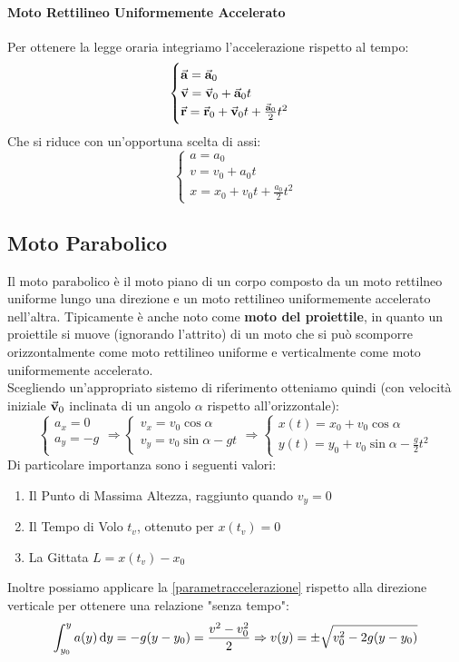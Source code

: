 \documentclass{report}
\newcommand{\then}{\ensuremath{\Rightarrow}}
\renewcommand{\a}{\va{a}}
\renewcommand{\v}{\va{v}}
\renewcommand{\r}{\va{r}}
\begin{document}
\paragraph{Moto Rettilineo Uniformemente Accelerato}
Per ottenere la legge oraria integriamo l'accelerazione rispetto al tempo:
\begin{equation}
\begin{cases}
\a=\a_0\\
\v=\v_0+\a_0t\\
\r=\r_0+\v_0t+\frac{\a_0}{2}t^2
\end{cases}
\end{equation}
Che si riduce con un'opportuna scelta di assi:
\begin{equation}
\begin{cases}
a=a_0\\
v=v_0+a_0t\\
x=x_0+v_0t+\frac{a_0}{2}t^2
\end{cases}
\end{equation}
\subsection{Moto Parabolico}
Il moto parabolico è il moto piano di un corpo composto da un moto rettilneo uniforme lungo una direzione e un moto rettilineo uniformemente accelerato nell'altra. Tipicamente è anche noto come \textbf{moto del proiettile}, in quanto un proiettile si muove (ignorando l'attrito) di un moto che si può scomporre orizzontalmente come moto rettilineo uniforme e verticalmente come moto uniformemente accelerato.\\
Scegliendo un'appropriato sistemo di riferimento otteniamo quindi (con velocità iniziale $\v_0$ inclinata di un angolo $\alpha$ rispetto all'orizzontale):
\begin{equation}
\begin{cases}
a_x=0\\
a_y=-g\\
\end{cases}\then
\begin{cases}
v_x=v_{0}\cos\alpha\\
v_y=v_0\sin\alpha-gt
\end{cases}\then
\begin{cases}
x(t)=x_0+v_0\cos\alpha\\
y(t)=y_0+v_0\sin\alpha-\frac{g}{2}t^2
\end{cases}
\end{equation}
Di particolare importanza sono i seguenti valori:
\begin{enumerate}
    \item Il Punto di Massima Altezza, raggiunto quando $v_y=0$
    \item Il Tempo di Volo $t_v$, ottenuto per $x(t_v)=0$
    \item La Gittata $L=x(t_v)-x_0$
\end{enumerate}
Inoltre possiamo applicare la \ref{parametraccelerazione} rispetto alla direzione verticale per ottenere una relazione "senza tempo":
\begin{equation}
    \int_{y_0}^ya(y)\dif y=-g(y-y_0)=\frac{v^2-v_0^2}{2}\then v(y)=\pm\sqrt{v_0^2-2g(y-y_0)}
\end{equation}
\end{document}
